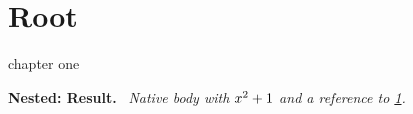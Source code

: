 \documentclass{article}
\newenvironment{keypoint}[2][Default heading]{\par\noindent\textbf{#1: #2.}\ \itshape}{\par}
\newenvironment{nestedpoint}[1]{\begin{keypoint}[Nested]{#1}}{\end{keypoint}}
\begin{document}
\section{Root}\label{sec:root}
{chapter one}


\begin{nestedpoint}{Result}
Native body with $x^2+1$ and a reference to \ref{sec:root}.
\end{nestedpoint}
\end{document}
